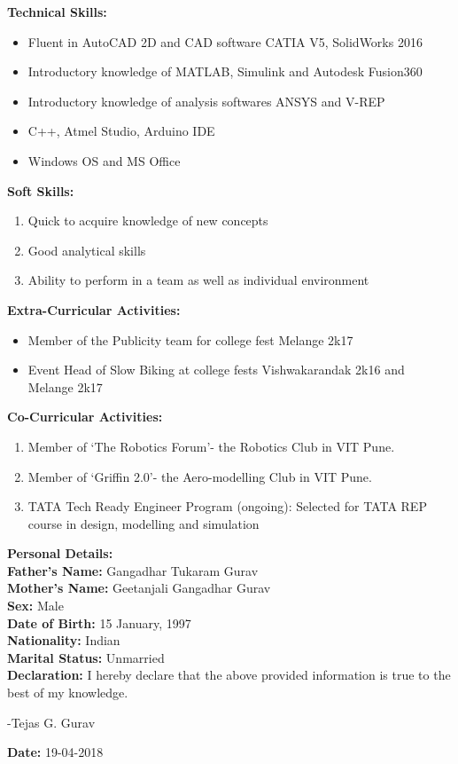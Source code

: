 \documentclass{article}
\begin{document}
\begin{flushleft}
		\medskip
		\textbf{Technical Skills:} 
		\begin{itemize}
			\item Fluent in AutoCAD 2D and CAD software CATIA V5, SolidWorks 2016
			\item Introductory knowledge of MATLAB, Simulink and Autodesk Fusion360
			\item Introductory knowledge of analysis softwares ANSYS and V-REP
			\item C++, Atmel Studio, Arduino IDE
			\item Windows OS and MS Office
		\end{itemize}
		
		\pagebreak
		\textbf{Soft Skills:} 
		\begin{enumerate}
			\item Quick to acquire knowledge of new concepts
			\item Good analytical skills
			\item Ability to perform in a team as well as individual environment
		\end{enumerate}
	
		\medskip
		\textbf{Extra-Curricular Activities:} 
		\begin{itemize}
			\item Member of the Publicity team for college fest Melange 2k17
			\item Event Head of Slow Biking at college fests Vishwakarandak 2k16 and Melange 2k17
		\end{itemize}
	
		\medskip
		\textbf{Co-Curricular Activities:} 
		\begin{enumerate}
			\item Member of ‘The Robotics Forum’- the Robotics Club in VIT Pune.
			\item Member of ‘Griffin 2.0’- the Aero-modelling Club in VIT Pune.
			\item TATA Tech Ready Engineer Program (ongoing): Selected for TATA REP course in design, modelling and simulation
		\end{enumerate}
	
		\medskip
		\textbf{Personal Details:}\\
		\medskip
		\textbf{Father's Name:} Gangadhar Tukaram Gurav\\
		\textbf{Mother's Name:} Geetanjali Gangadhar Gurav\\
		\textbf{Sex:} Male\\
		\textbf{Date of Birth:} 15 January, 1997\\
		\textbf{Nationality:} Indian\\
		\textbf{Marital Status:} Unmarried\\
		
		\bigskip
		\textbf{Declaration:}	I hereby declare that the above provided information is true to the best of my knowledge.
	\end{flushleft}
	\begin{flushright}
		-Tejas G. Gurav
	\end{flushright}
	
	\begin{flushleft}
		\medskip
		\textbf{Date:} 19-04-2018
	\end{flushleft}	
			
\end{document}
